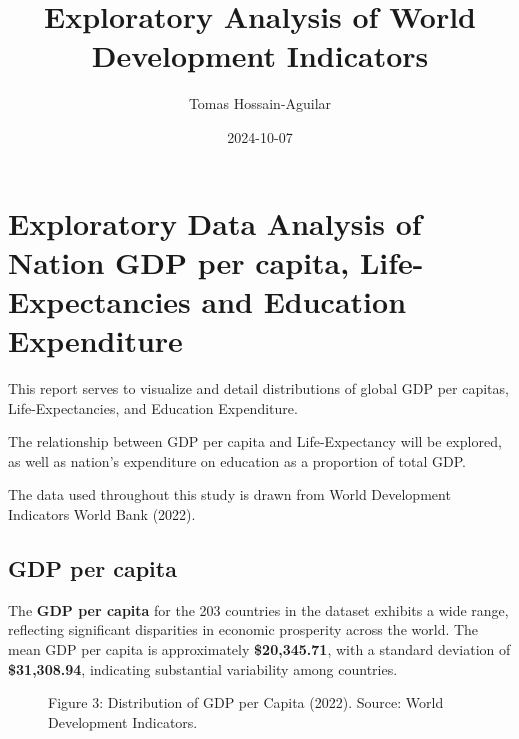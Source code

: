 \documentclass[
]{article}
\title{Exploratory Analysis of World Development Indicators}
\author{Tomas Hossain-Aguilar}
\date{2024-10-07}
\renewcommand*\contentsname{Table of contents}
\newcommand\contentsname{Table of contents}
\begin{document}
\maketitle

\renewcommand*\contentsname{Table of contents}
{
\hypersetup{linkcolor=}
\setcounter{tocdepth}{3}
\tableofcontents
}

\section{Exploratory Data Analysis of Nation GDP per capita,
Life-Expectancies and Education
Expenditure}\label{exploratory-data-analysis-of-nation-gdp-per-capita-life-expectancies-and-education-expenditure}

This report serves to visualize and detail distributions of global GDP
per capitas, Life-Expectancies, and Education Expenditure.

The relationship between GDP per capita and Life-Expectancy will be
explored, as well as nation's expenditure on education as a proportion
of total GDP.

The data used throughout this study is drawn from World Development
Indicators World Bank (2022).

\subsection{GDP per capita}\label{gdp-per-capita}

The \textbf{GDP per capita} for the 203 countries in the dataset
exhibits a wide range, reflecting significant disparities in economic
prosperity across the world. The mean GDP per capita is approximately
\textbf{\$20,345.71}, with a standard deviation of \textbf{\$31,308.94},
indicating substantial variability among countries.

\begin{figure}


\caption{\label{fig-gdp-histogram}Figure 3: Distribution of GDP per
Capita (2022). Source: World Development Indicators.}

\end{figure}%
\end{document}
